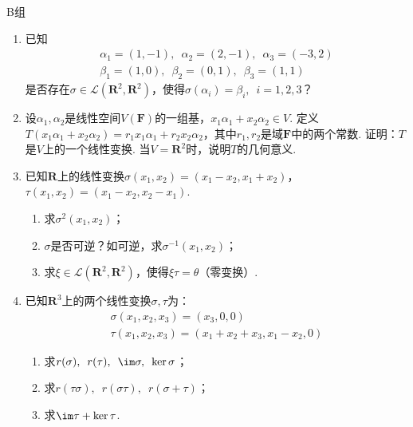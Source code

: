 \centerline{\heiti B组}
\begin{enumerate}
    \item 已知
          \begin{gather*}
              \alpha_1=(1,-1),\enspace\alpha_2=(2,-1),\enspace\alpha_3=(-3,2) \\
              \beta_1=(1,0),\enspace\beta_2=(0,1),\enspace\beta_3=(1,1)
          \end{gather*}
          是否存在$\sigma\in \mathcal{L}(\mathbf{R}^2,\mathbf{R}^2)$，使得$\sigma(\alpha_i)=\beta_i,\enspace i=1,2,3$？

    \item 设$\alpha_1,\alpha_2$是线性空间$V(\mathbf{F})$的一组基，$x_1\alpha_1+x_2\alpha_2 \in V$. 定义$T(x_1\alpha_1+x_2\alpha_2)=r_1x_1\alpha_1+r_2x_2\alpha_2$，其中$r_1,r_2$是域$\mathbf{F}$中的两个常数. 证明：$T$是$V$上的一个线性变换. 当$V=\mathbf{R}^2$时，说明$T$的几何意义.

    \item 已知$\mathbf{R}$上的线性变换$\sigma(x_1,x_2)=(x_1-x_2,x_1+x_2)$，$\tau(x_1,x_2)=(x_1-x_2,x_2-x_1)$.
          \begin{enumerate}
              \item 求$\sigma^2(x_1,x_2)$；

              \item $\sigma$是否可逆？如可逆，求$\sigma^{-1}(x_1,x_2)$；

              \item 求$\xi\in \mathcal{L}(\mathbf{R}^2,\mathbf{R}^2)$，使得$\xi\tau=\theta$（零变换）.
          \end{enumerate}

    \item 已知$\mathbf{R}^3$上的两个线性变换$\sigma,\tau$为：
          \begin{gather*}
              \sigma(x_1,x_2,x_3)=(x_3,0,0) \\
              \tau(x_1,x_2,x_3)=(x_1+x_2+x_3,x_1-x_2,0)
          \end{gather*}
          \begin{enumerate}
              \item 求$r(\sigma),\enspace r(\tau),\enspace \im\sigma,\enspace \ker\sigma$；

              \item 求$r(\tau\sigma),\enspace r(\sigma\tau),\enspace r(\sigma+\tau)$；

              \item 求$\im\tau+\ker\tau$.
          \end{enumerate}


\end{enumerate}
